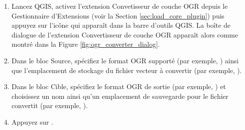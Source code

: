 
\begin{enumerate}
  \item Lancez QGIS, activez l'extension Convetisseur de couche OGR depuis le 
  Gestionnaire d'Extensions (voir la Section \ref{sec:load_core_plugin}) puis 
  appuyez sur l'icône  
  qui apparaît dans la barre d'outils QGIS. La boîte de dialogue de 
  l'extension Convertisseur de couche OGR apparaît alors comme montré dans la 
  Figure \ref{fig:ogr_converter_dialog}.
  \item Dans le bloc Source, spécifiez le format OGR supporté (par exemple, ) 
  ainsi que l'emplacement de stockage du fichier vecteur à convertir (par exemple, ).
  \item Dans le bloc Cible, spécifiez le format OGR de sortie (par exemple, ) 
  et choisissez un nom ainsi qu'un emplacement de sauvegarde pour le fichier 
  convertit (par exemple, ).
  \item Appuyez sur .
\end{enumerate}

\newpage

